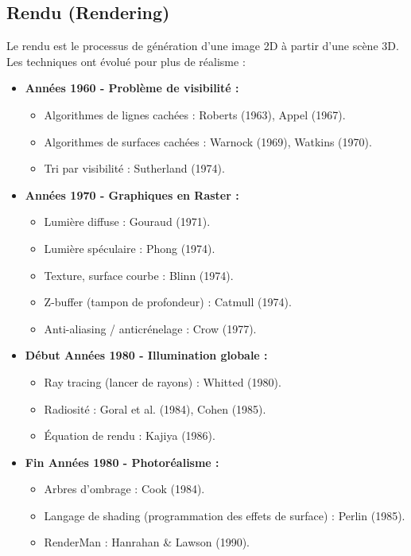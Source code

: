 \documentclass{article}
\begin{document}
\subsection{Rendu (Rendering)}
Le rendu est le processus de génération d'une image 2D à partir d'une scène 3D. Les techniques ont évolué pour plus de réalisme :
\begin{itemize}
    \item \textbf{Années 1960 - Problème de visibilité :}
    \begin{itemize}
        \item Algorithmes de lignes cachées : Roberts (1963), Appel (1967).
        \item Algorithmes de surfaces cachées : Warnock (1969), Watkins (1970).
        \item Tri par visibilité : Sutherland (1974).
    \end{itemize}
    \item \textbf{Années 1970 - Graphiques en Raster :}
    \begin{itemize}
        \item Lumière diffuse : Gouraud (1971).
        \item Lumière spéculaire : Phong (1974).
        \item Texture, surface courbe : Blinn (1974).
        \item Z-buffer (tampon de profondeur) : Catmull (1974).
        \item Anti-aliasing / anticrénelage : Crow (1977).
    \end{itemize}
    \item \textbf{Début Années 1980 - Illumination globale :}
    \begin{itemize}
        \item Ray tracing (lancer de rayons) : Whitted (1980).
        \item Radiosité : Goral et al. (1984), Cohen (1985).
        \item Équation de rendu : Kajiya (1986).
    \end{itemize}
    \item \textbf{Fin Années 1980 - Photoréalisme :}
    \begin{itemize}
        \item Arbres d'ombrage : Cook (1984).
        \item Langage de shading (programmation des effets de surface) : Perlin (1985).
        \item RenderMan : Hanrahan \& Lawson (1990).
    \end{itemize}

\end{itemize}
\end{document}
